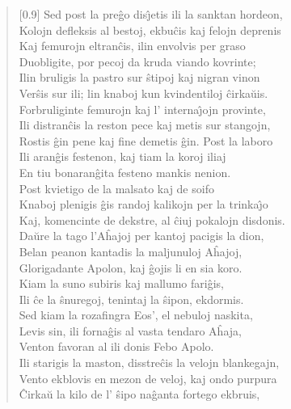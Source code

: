 \begin{verse}[0.9\textwidth]
          Sed post la pre\^go dis\^{\j}etis ili la sanktan hordeon,\\
          Kolojn defleksis al bestoj, ekbu\^cis kaj felojn deprenis\\
          Kaj femurojn eltran\^cis, ilin envolvis per graso\\
          Duobligite, por pecoj da kruda viando kovrinte;\\
          Ilin bruligis la pastro sur \^stipoj kaj nigran vinon\\
          Ver\^sis sur ili; lin knaboj kun kvindentiloj \^cirka\u uis.\\
          Forbruliginte femurojn kaj l' interna\^{\j}ojn provinte,\\
          Ili distran\^cis la reston pece kaj metis sur stangojn,\\
          Rostis \^gin pene kaj fine demetis \^gin. Post la laboro\\
          Ili aran\^gis festenon, kaj tiam la koroj iliaj\\
          En tiu bonaran\^gita festeno mankis nenion.\\
          Post kvietigo de la malsato kaj de soifo\\
          Knaboj plenigis \^gis randoj kalikojn per la trinka\^{\j}o\\
          Kaj, komencinte de dekstre, al \^ciuj pokalojn disdonis.\\
          Da\u ure la tago l'A\^hajoj per kantoj pacigis la dion,\\
          Belan peanon kantadis la maljunuloj A\^hajoj,\\
          Glorigadante Apolon, kaj \^gojis li en sia koro.\\
           \vin  Kiam la suno subiris kaj mallumo fari\^gis,\\
          Ili \^ce la \^snuregoj, tenintaj la \^sipon, ekdormis.\\
          Sed kiam la rozafingra Eos', el nebuloj naskita,\\
          Levis sin, ili forna\^gis al vasta tendaro A\^haja,\\
          Venton favoran al ili donis Febo Apolo.\\
          Ili starigis la maston, disstre\^cis la velojn blankegajn,\\
          Vento ekblovis en mezon de veloj, kaj ondo purpura\\
          \^Cirka\u u la kilo de l' \^sipo na\^ganta fortego ekbruis,\\

\end{verse}

